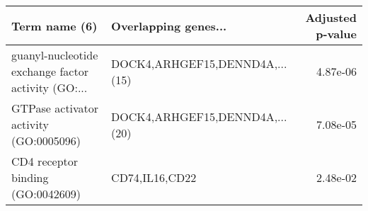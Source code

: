 \begin{tabular}{llr}
\toprule
                                     Term name (6) &           Overlapping genes... &  Adjusted p-value \\
\midrule
guanyl-nucleotide exchange factor activity (GO:... & DOCK4,ARHGEF15,DENND4A,...(15) &          4.87e-06 \\
            GTPase activator activity (GO:0005096) & DOCK4,ARHGEF15,DENND4A,...(20) &          7.08e-05 \\
                 CD4 receptor binding (GO:0042609) &                 CD74,IL16,CD22 &          2.48e-02 \\
\bottomrule
\end{tabular}
